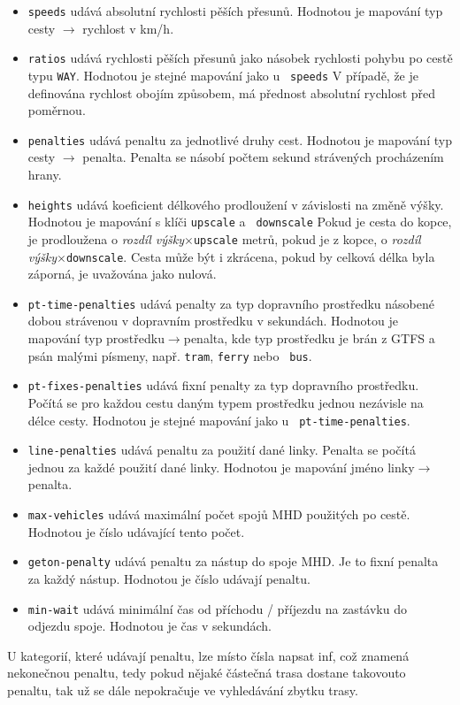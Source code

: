 \begin{itemize}
	\item {\tt speeds} udává absolutní rychlosti pěších přesunů. Hodnotou je mapování
	typ cesty $\rightarrow$ rychlost v km/h.
	\item {\tt ratios} udává rychlosti pěších přesunů jako násobek rychlosti
	pohybu po cestě typu {\tt WAY}. Hodnotou je stejné mapování jako u {\tt
	speeds} V případě, že je definována rychlost obojím způsobem, má
	přednost absolutní rychlost před poměrnou.
	\item {\tt penalties} udává penaltu za jednotlivé druhy cest. Hodnotou
	je mapování typ cesty $\rightarrow$ penalta. Penalta se násobí počtem
	sekund strávených procházením hrany. 
	\item {\tt heights} udává koeficient délkového prodloužení v závislosti
	na změně výšky. Hodnotou je mapování s klíči {\tt upscale} a {\tt
	downscale}  Pokud je cesta do kopce, je prodloužena o {\em rozdíl
	výšky}$\times${\tt upscale} metrů, pokud je z kopce, o {\em rozdíl
	výšky}$\times${\tt downscale}. Cesta může být i zkrácena, pokud by
	celková délka byla záporná, je uvažována jako nulová.
	\item {\tt pt-time-penalties} udává penalty za typ dopravního prostředku
	násobené dobou strávenou v dopravním prostředku v sekundách. Hodnotou je
	mapování typ prostředku$\rightarrow$penalta, kde typ prostředku je brán
	z GTFS a psán malými písmeny, např. {\tt tram}, {\tt ferry} nebo {\tt
	bus}.
	\item {\tt pt-fixes-penalties} udává fixní penalty za typ dopravního
	prostředku. Počítá se pro každou cestu daným typem prostředku jednou
	nezávisle na délce cesty. Hodnotou je stejné mapování jako u {\tt
	pt-time-penalties}.
	\item {\tt line-penalties} udává penaltu za použití dané linky. Penalta
	se počítá jednou za každé použití dané linky. Hodnotou je mapování jméno
	linky$\rightarrow$penalta. 
	\item {\tt max-vehicles} udává maximální počet spojů MHD použitých po
	cestě. Hodnotou je číslo udávající tento počet.
	\item {\tt geton-penalty} udává penaltu za nástup do spoje MHD. Je to
	fixní penalta za každý nástup. Hodnotou je číslo udávají penaltu.
	\item {\tt min-wait} udává minimální čas od příchodu /
	příjezdu na zastávku do odjezdu spoje. Hodnotou je čas v sekundách.
\end{itemize}
U kategorií, které udávají penaltu, lze místo čísla napsat inf, což znamená
nekonečnou penaltu, tedy pokud nějaké částečná trasa dostane takovouto penaltu,
tak už se dále nepokračuje ve vyhledávání zbytku trasy.

